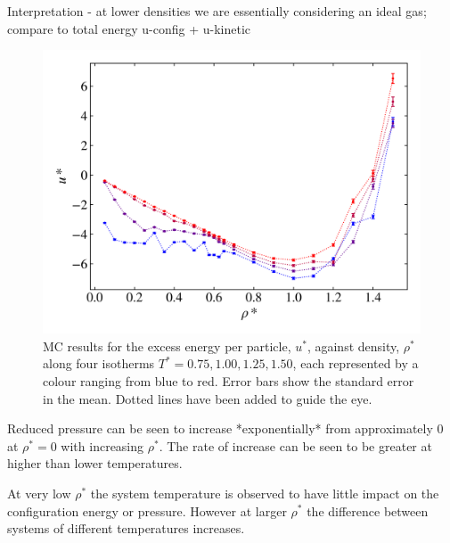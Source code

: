 \documentclass[10pt, twocolumn]{revtex4}    %
\begin{document}
Interpretation - at lower densities we are essentially considering an ideal gas; compare to total energy u-config + u-kinetic

\begin{figure}
	\includegraphics[width=\linewidth]{figures/excessEnergyPressure/excessEnergy.png}
	\caption{MC results for the excess energy per particle, $u^{*}$, against density, $\rho{}^{*}$ along four isotherms $T^{*}=0.75, 1.00, 1.25, 1.50$, each represented by a colour ranging from blue to red. Error bars show the standard error in the mean. Dotted lines have been added to guide the eye.}
	\label{fig:excessEnergy}
\end{figure}

Reduced pressure can be seen to increase *exponentially* from approximately $0$ at $\rho{}^*=0$ with increasing $\rho{}^*$. The rate of increase can be seen to be greater at higher than lower temperatures.


At very low $\rho{}^*$ the system temperature is observed to have little impact on the configuration energy or pressure. However at larger $\rho{}^*$ the difference between systems of different temperatures increases.
\end{document}
